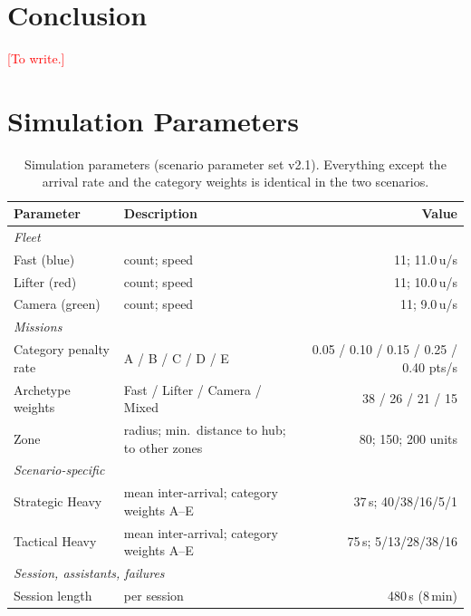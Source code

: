 \documentclass[10pt]{article}
\theoremstyle{definition}
\newcommand{\todo}[1]{\textcolor{red}{[#1]}}
\begin{document}
\section{Conclusion}\label{sec:conclusion}
\todo{To write.}




\appendix

\section{Simulation Parameters}\label{app:params}

\begin{table}[htbp]
\centering
\caption{Simulation parameters (scenario parameter set v2.1). Everything except the arrival rate and the category
weights is identical in the two scenarios.}
\label{tab:params}
\small
\renewcommand{\arraystretch}{1.2}
\begin{tabular}{llr}
\toprule
\textbf{Parameter} & \textbf{Description} & \textbf{Value} \\
\midrule
\multicolumn{3}{l}{\textit{Fleet}} \\
Fast (blue)    & count; speed & 11; 11.0\,u/s \\
Lifter (red)   & count; speed & 11; 10.0\,u/s \\
Camera (green) & count; speed & 11; 9.0\,u/s \\
\midrule
\multicolumn{3}{l}{\textit{Missions}} \\
Category penalty rate & A / B / C / D / E & 0.05 / 0.10 / 0.15 / 0.25 / 0.40 pts/s \\
Archetype weights & Fast / Lifter / Camera / Mixed & 38 / 26 / 21 / 15 \\
Zone & radius; min.\ distance to hub; to other zones & 80; 150; 200 units \\
\midrule
\multicolumn{3}{l}{\textit{Scenario-specific}} \\
Strategic Heavy & mean inter-arrival; category weights A--E & 37\,s; 40/38/16/5/1 \\
Tactical Heavy  & mean inter-arrival; category weights A--E & 75\,s; 5/13/28/38/16 \\
\midrule
\multicolumn{3}{l}{\textit{Session, assistants, failures}} \\
Session length & per session & 480\,s (8\,min) \\

\end{tabular}
\end{table}
\end{document}

